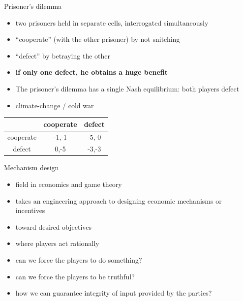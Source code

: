 \documentclass{beamer}
\begin{document}
\begin{frame}[t]{Prisoner's dilemma}
  \begin{itemize}
    \item two prisoners held in separate cells, interrogated simultaneously
    \item ``cooperate'' (with the other prisoner) by not snitching
    \item ``defect'' by betraying the other
    \item<2-> \textbf{if only one defect, he obtains a huge benefit}
    \item<4->  The prisoner's dilemma has a single Nash equilibrium:
      both players defect
    \item<5->  climate-change / cold war
  \end{itemize}
   {
\begin{center}
  \begin{tabular}{|c|c|c|}
    \hline
              & cooperate & defect  \\
    \hline
cooperate     & -1,-1 & -5, 0 \\
    \hline
defect        & 0,-5 & -3,-3 \\
    \hline
  \end{tabular}
\end{center}
}
\end{frame}



\begin{frame}{Mechanism design}
  \begin{itemize}
    \item field in economics and game theory
    \item takes an engineering approach to designing economic
      mechanisms or incentives
    \item toward desired objectives
    \item where players act rationally
    \item can we force the players to do something?
    \item can we force the players to be truthful?
    \item how we can guarantee integrity of input provided by the parties?
  \end{itemize}
\end{frame}
\end{document}
